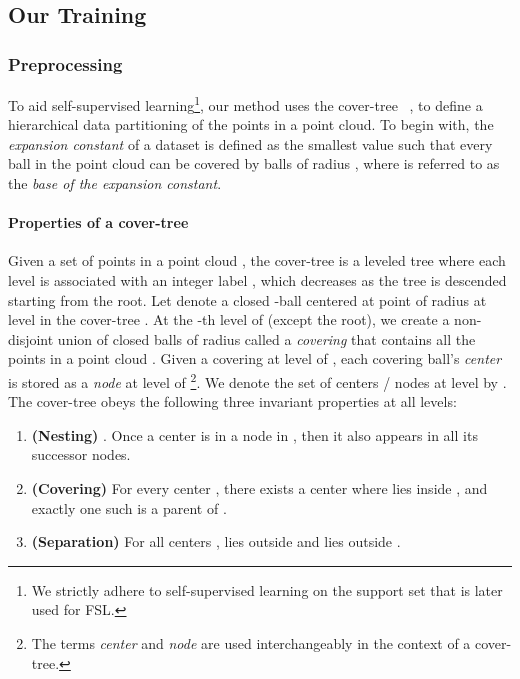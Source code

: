\documentclass{article}
\begin{document}
\subsection{Our Training}
\label{subsec:training}
\subsubsection{Preprocessing}
\label{ssec:preproc}
To aid self-supervised learning\footnote{We strictly adhere to self-supervised learning on the support set  that is later used for FSL.}, our method uses the cover-tree~\cite{beygelzimer2006cover} , to define a hierarchical data partitioning of the points in a point cloud. 
To begin with, the \emph{expansion constant}  of a dataset is defined as the smallest value such that every ball in the point cloud  can be covered by  balls of radius , where  is referred to as the \emph{base of the expansion constant}.
\paragraph{Properties of a cover-tree~\cite{beygelzimer2006cover}} Given a set of points in a point cloud , the cover-tree  is a leveled tree where each level is associated with an integer label , which decreases as the tree is descended starting from the root. 
Let  denote a closed -ball centered at point  of radius  at level  in the cover-tree .
At the -th level of  (except the root), we create a non-disjoint union of closed balls of radius  
called a \emph{covering} that contains all the points in a point cloud . Given a covering at level  of , each covering ball's \emph{center} is stored as a \emph{node} at level  of \footnote{The terms \emph{center} and \emph{node} are used interchangeably in the context of a cover-tree.}.
We denote the set of centers / nodes at level  by . 
The cover-tree  obeys the following three invariant properties at all levels:
\begin{enumerate}
	\setlength{\parskip}{0cm}
	\setlength{\itemsep}{0cm}
 	
 	\item \textbf{(Nesting)} . Once a center  is in a node in , then it also appears in all its successor nodes.
 	\item \textbf{(Covering)} For every center , there exists a center  where  lies inside , and exactly one such  is a parent of .
 	\item \textbf{(Separation)} For all centers ,  lies outside 
 	 and  lies outside .
\end{enumerate}
\fi
\end{document}
